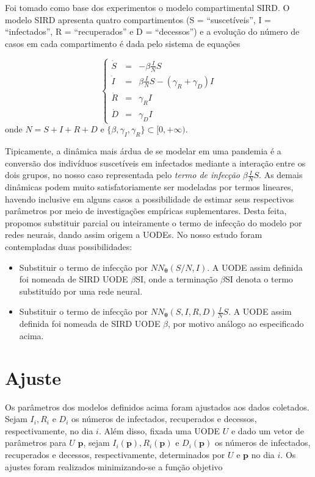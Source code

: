 \documentclass[a4paper,12pt]{article}
\begin{document}
Foi tomado como base dos experimentos o modelo compartimental SIRD. O modelo SIRD apresenta quatro compartimentos (S = “suscetíveis”, I = “infectados”, R = “recuperados” e D = “decessos”) e a evolução do número de casos em cada compartimento é dada pelo sistema de equações

$$
\left\{
\begin{array}{ccl}
	\dot S & = & -\beta \frac{I}{N} S \\
	\dot I & = &  \beta \frac{I}{N} S - \left(\gamma_R + \gamma_D\right) I\\
	\dot R & = & \gamma_R I \\
	\dot D & = & \gamma_D I
\end{array}
\right.
$$
onde $N = S+I+R+D$ e $\{\beta, \gamma_I, \gamma_R\} \subset [0, +\infty)$.

Tipicamente, a dinâmica mais árdua de se modelar em uma pandemia é a conversão dos indivíduos suscetíveis em infectados mediante a interação entre os dois grupos, no nosso caso representada pelo \textit{termo de infecção} $\beta\frac{I}{N}S$. As demais dinâmicas podem muito satisfatoriamente ser modeladas por termos lineares, havendo inclusive em alguns casos a possibilidade de estimar seus respectivos parâmetros por meio de investigações empíricas suplementares. Desta feita, propomos substituir parcial ou inteiramente o termo de infecção do modelo por redes neurais, dando assim origem a UODEs. No nosso estudo foram contempladas duas possibilidades:

\begin{itemize}
	\item Substituir o termo de infecção por $N\!N_{\boldsymbol{\theta}}(S/N, I)$. A UODE assim definida foi nomeada de SIRD UODE $\beta$SI, onde a terminação $\beta$SI denota o termo substituído por uma rede neural.
	\item Substituir o termo de infecção por $N\!N_{\boldsymbol{\theta}}(S,I,R,D)\frac{I}{N}S$. A UODE assim definida foi nomeada de SIRD UODE $\beta$, por motivo análogo ao especificado acima.
\end{itemize}

\section{Ajuste}

Os parâmetros dos modelos definidos acima foram ajustados aos dados coletados. Sejam $I_i, R_i$ e $D_i$ os números de infectados, recuperados e decessos, respectivamente, no dia $i$. Além disso, fixada uma UODE $U$ e dado um vetor de parâmetros para $U$ $\mathbf{p}$, sejam $I_i(\mathbf{p}), R_i(\mathbf{p})$ e $D_i(\mathbf{p})$ os números de infectados, recuperados e decessos, respectivamente, determinados por $U$ e $\mathbf{p}$ no dia $i$. Os ajustes foram realizados minimizando-se a função objetivo
\end{document}
